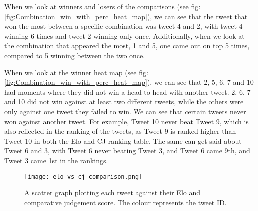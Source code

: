 	
	
	When we look at winners and losers of the comparisons (see fig: \ref{fig:Combination_win_with_perc_heat_map}), we can see that the tweet that won the most between a specific combination was tweet 4 and 2, with tweet 4 winning 6 times and tweet 2 winning only once. Additionally, when we look at the combination that appeared the most, 1 and 5, one came out on top 5 times, compared to 5 winning between the two once.
	
	When we look at the winner heat map (see fig: \ref{fig:Combination_win_with_perc_heat_map}), we can see that 2, 5, 6, 7 and 10 had moments where they did not win a head-to-head with another tweet. 2, 6, 7 and 10 did not win against at least two different tweets, while the others were only against one tweet they failed to win. We can see that certain tweets never won against another tweet. For example, Tweet 10 never beat Tweet 9, which is also reflected in the ranking of the tweets, as Tweet 9 is ranked higher than Tweet 10 in both the Elo and CJ ranking table. The same can get said about Tweet 6 and 3, with Tweet 6 never beating Tweet 3, and Tweet 6 came 9th, and Tweet 3 came 1st in the rankings.
	
	\begin{figure}[h]
		\centering
		\texttt{[image: elo\_vs\_cj\_comparison.png]}
		\caption{A scatter graph plotting each tweet against their Elo and comparative judgement score. The colour represents the tweet ID.}
		\label{fig:elo_vs_cj_comparison}
		
	\end{figure}
	
		
	


